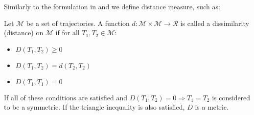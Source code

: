 Similarly to the formulation in \cite{encyclopedia} and \cite{distance-def} we define distance measure, such as:

\begin{definition}
Let $\mathcal{M}$ be a set of trajectories. A function $d :\mathcal{M} \times \mathcal{M} \rightarrow \mathcal{R}$ is called a dissimilarity (distance) on $\mathcal{M}$ if for all $T_{1}, T_{2} \in \mathcal{M}$: 
\begin{itemize}
    \item $D(T_{1},T_{2}) \geqslant 0$
    \item $D(T_{1},T_{2}) = d(T_{2},T_{2})$
    \item $D(T_{1},T_{1}) = 0$
\end{itemize}
If all of these conditions are satisfied and $D(T_{1}, T_{2}) = 0 \Rightarrow  T_{1} = T_{2} $ is considered to be a symmetric. If
the triangle inequality is also satisfied, $D$ is a metric.
\end{definition}





